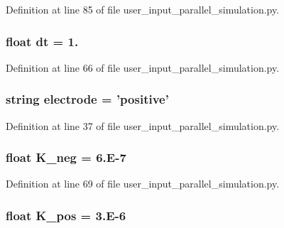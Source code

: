 Definition at line 85 of file user\-\_\-input\-\_\-parallel\-\_\-simulation.\-py.

\hypertarget{namespaceuser__input__parallel__simulation_a778e38aa889751afffa2dea6b803e67a}{
\subsubsection[{dt}]{\setlength{\rightskip}{0pt plus 5cm}float dt = 1.}}\label{namespaceuser__input__parallel__simulation_a778e38aa889751afffa2dea6b803e67a}


Definition at line 66 of file user\-\_\-input\-\_\-parallel\-\_\-simulation.\-py.

\hypertarget{namespaceuser__input__parallel__simulation_a6d9f4e281307eca8be6bad984ed9786d}{
\subsubsection[{electrode}]{\setlength{\rightskip}{0pt plus 5cm}string electrode = 'positive'}}\label{namespaceuser__input__parallel__simulation_a6d9f4e281307eca8be6bad984ed9786d}


Definition at line 37 of file user\-\_\-input\-\_\-parallel\-\_\-simulation.\-py.

\hypertarget{namespaceuser__input__parallel__simulation_a64d0c5854299798787675bc91586023c}{
\subsubsection[{K\-\_\-neg}]{\setlength{\rightskip}{0pt plus 5cm}float K\-\_\-neg = 6.\-E-\/7}}\label{namespaceuser__input__parallel__simulation_a64d0c5854299798787675bc91586023c}


Definition at line 69 of file user\-\_\-input\-\_\-parallel\-\_\-simulation.\-py.

\hypertarget{namespaceuser__input__parallel__simulation_ab1a8ebec490ba1301f818bd1c5f1f3fa}{
\subsubsection[{K\-\_\-pos}]{\setlength{\rightskip}{0pt plus 5cm}float K\-\_\-pos = 3.\-E-\/6}}\label{namespaceuser__input__parallel__simulation_ab1a8ebec490ba1301f818bd1c5f1f3fa}


